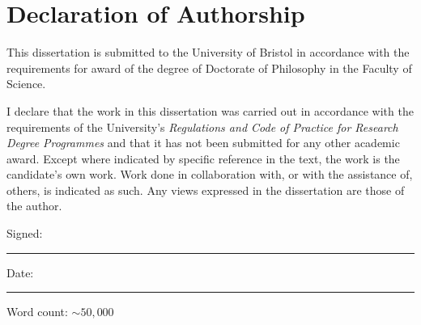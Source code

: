 \chapter*{Declaration of Authorship}

This dissertation is submitted to the University of Bristol
in accordance with the requirements for award of the degree of 
Doctorate of Philosophy in the Faculty of Science.
\vspace{2cm}

I declare that the work in this dissertation was carried out in accordance with the 
requirements of the University's \emph{Regulations and Code of Practice for Research Degree Programmes}
and that it has not been submitted for any other academic award. 
Except where indicated by specific reference in the text, the work is the candidate's own work. 
Work done in collaboration with, or with the assistance of, others, is indicated as such. 
Any views expressed in the dissertation are those of the author.

\vspace{1.5cm}
Signed: 
\begin{center}
    \rule{12cm}{0.25mm}
\end{center}

\vspace{1.5cm}
Date: 
\begin{center}
    \rule{12cm}{0.25mm}
\end{center}


\vspace{4cm}
\begin{flushright}
    \small{Word count: $\sim50,000$}
\end{flushright}
